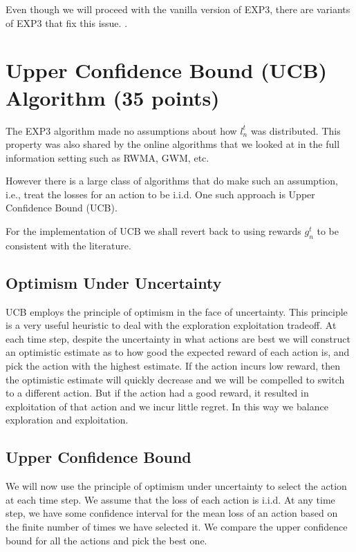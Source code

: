 \documentclass{article}
\begin{document}
\noindent Even though we will proceed with the vanilla version of EXP3, there are variants of EXP3 that fix this issue. \cite{bubeck_bandit2012}.


\section{Upper Confidence Bound (UCB) Algorithm (35 points)}

The EXP3 algorithm made no assumptions about how $l^t_n$ was distributed. This property was also shared by the online algorithms that we looked at in the full information setting such as RWMA, GWM, etc.

However there is a large class of algorithms that do make such an assumption, i.e., treat the losses for an action to be i.i.d. One such approach is Upper Confidence Bound (UCB).

For the implementation of UCB we shall revert back to using rewards $g^t_n$ to be consistent with the literature. 

\subsection{Optimism Under Uncertainty}

UCB employs the principle of optimism in the face of uncertainty. This principle is a very useful heuristic to deal with the exploration exploitation tradeoff. At each time step, despite the uncertainty in what actions are best we will construct an optimistic estimate as to how good the expected reward of each action is, and pick the action with the highest estimate. If the action incurs low reward, then the optimistic estimate will quickly decrease and we will be compelled to switch to a different action. But if the action had a good reward, it resulted in exploitation of that action and we incur little regret. In this way we balance exploration and exploitation. 

\subsection{Upper Confidence Bound}

We will now use the principle of optimism under uncertainty to select the action at each time step. We assume that the loss of each action is i.i.d. At any time step, we have some confidence interval for the mean loss of an action based on the finite number of times we have selected it. We compare the upper confidence bound for all the actions and pick the best one. 
\end{document}
